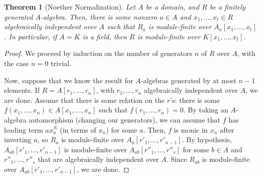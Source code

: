 \documentclass{amsart}[12pt]
\numberwithin{equation}{section}
\theoremstyle{plain} %
\newtheorem{theorem}[equation]{Theorem}
\theoremstyle{definition}
\theoremstyle{remark}
\newtheorem{remark}[equation]{Remark}
\begin{document}
\begin{theorem}[Noether Normalization]
 Let $A$ be a domain, and $R$ be a finitely generated $A$-algebra. Then, there is some nonzero $a\in A$ and $x_1,\dots,x_t\in R$ algebraically independent over $A$ such that $R_a$ is module-finite over $A_a[x_1,\dots,x_t]$. In particular, if $A=K$ is a field, then $R$ is module-finite over $K[x_1,\dots,x_t]$.
\end{theorem}
\begin{proof}
We proceed by induction on the number of generators $n$ of $R$ over $A$, with the case $n=0$ trivial.

Now, suppose that we know the result for $A$-algebras generated by at most $n-1$ elements. If $R=A[r_1,\dots,r_n]$, with $r_1,\dots,r_n$ algebraically independent over $A$, we are done. Assume that there is some relation on the $r$'s: there is some $f(x_1,\dots,x_n)\in A[x_1,\dots,x_n]$ such that $f(r_1,\dots,r_n)=0$. By taking an $A$-algebra automorphism (changing our generators), we can assume that $f$ has leading term $a x_n^N$ (in terms of $x_n$) for some $a$. Then, $f$ is monic in $x_n$ after inverting $a$, so $R_a$ is module-finite over $A_a[r'_1,\dots,r'_{n-1}]$. By hypothesis, $A_{ab}[r'_1,\dots,r'_{n-1}]$ is module-finite over $A_{ab}[r''_1,\dots,r''_s]$ for some $b\in A$ and $r''_1,\dots,r''_s$ that are algebraically independent over $A$. Since $R_{ab}$ is module-finite over $A_{ab}[r'_1,\dots,r'_{n-1}]$, we are done.

\end{proof}


	
\end{document}
